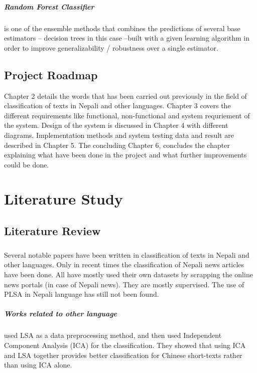 \documentclass[12pt]{report}
\begin{document}
        \paragraph{Random Forest Classifier}
        
        is one of the ensemble methods that combines the predictions of several base estimators -- decision trees in this case --built with a given learning algorithm 
        in order to improve generalizability / robustness over a single estimator.  


        \section{Project Roadmap}
        Chapter 2 details the words that has been carried out previously in the field of classification of texts in Nepali and other languages.         
        Chapter 3 covers the different requirements like functional, non-functional and system requriement of the system.
        Design of the system is discussed in Chapter 4 with different diagrams.
        Implementation methods and system testing data and result are described in Chapter 5.
        The concluding Chapter 6, concludes the chapter explaining what have been done in the project and what further improvements could be done.





    \chapter{Literature Study}
    
            \section{Literature Review}
                \paragraph{}
                    Several notable papers have been written in classification of texts in Nepali and other languages. Only in recent times the classification of Nepali news articles have been done.
                    All have mostly used their own datasets by scrapping the online news portals (in case of Nepali news). They are mostly supervised. The use of PLSA in Nepali language has still not been found.
                    
                    \paragraph{Works related to other language}
                            \cite{pu2006short} used LSA as a data preprocessing method, and then used Independent Component Analysis (ICA) for the classification. They showed that 
                            using ICA and LSA together provides better classification for Chinese short-texts rather than using ICA alone. 
                            
\end{document}
